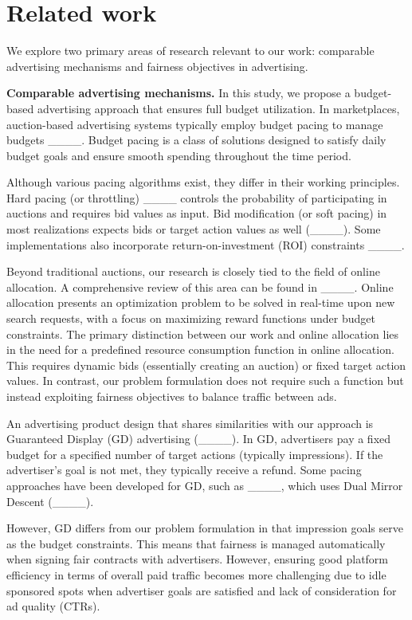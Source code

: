 \section{Related work}
We explore two primary areas of research relevant to our work: comparable advertising mechanisms and fairness objectives in advertising.

\textbf{Comparable advertising mechanisms.} In this study, we propose a budget-based advertising approach that ensures full budget utilization. In marketplaces, auction-based advertising systems typically employ budget pacing to manage budgets ____. Budget pacing is a class of solutions designed to satisfy daily budget goals and ensure smooth spending throughout the time period.

Although various pacing algorithms exist, they differ in their working principles. Hard pacing (or throttling) ____ controls the probability of participating in auctions and requires bid values as input. Bid modification (or soft pacing) in most realizations expects bids or target action values as well (____). Some implementations also incorporate return-on-investment (ROI) constraints ____.

Beyond traditional auctions, our research is closely tied to the field of online allocation. A comprehensive review of this area can be found in ____. Online allocation presents an optimization problem to be solved in real-time upon new search requests, with a focus on maximizing reward functions under budget constraints. The primary distinction between our work and online allocation lies in the need for a predefined resource consumption function in online allocation. This requires dynamic bids (essentially creating an auction) or fixed target action values. In contrast, our problem formulation does not require such a function but instead exploiting fairness objectives to balance traffic between ads.

An advertising product design that shares similarities with our approach is Guaranteed Display (GD) advertising (____). In GD, advertisers pay a fixed budget for a specified number of target actions (typically impressions). If the advertiser's goal is not met, they typically receive a refund. Some pacing approaches have been developed for GD, such as ____, which uses Dual Mirror Descent (____).

However, GD differs from our problem formulation in that impression goals serve as the budget constraints. This means that fairness is managed automatically when signing fair contracts with advertisers. However, ensuring good platform efficiency in terms of overall paid traffic becomes more challenging due to idle sponsored spots when advertiser goals are satisfied and lack of consideration for ad quality (CTRs).

